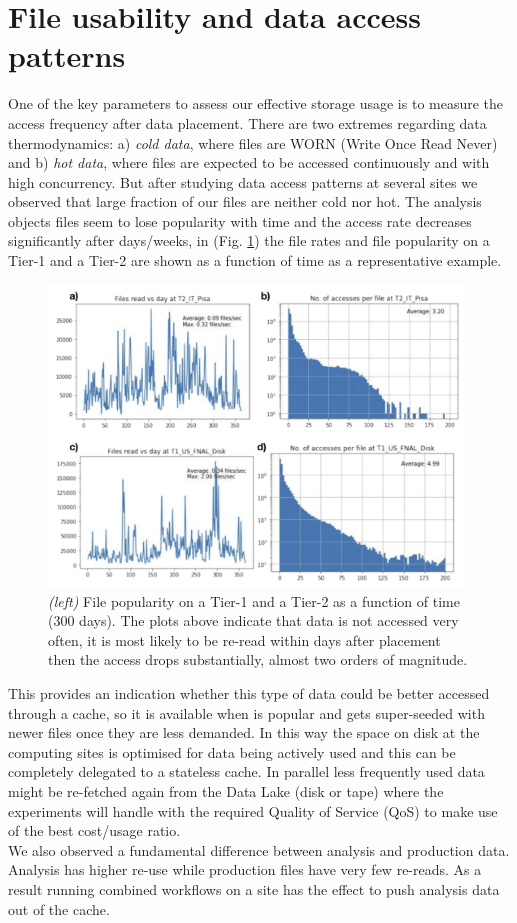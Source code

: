 \section{File usability and data access patterns}
One of the key parameters to assess our effective storage usage is to measure the access frequency after data placement. There are two extremes regarding data thermodynamics: a) \emph{cold data}, where files are WORN (Write Once Read Never) and b) \emph{hot data}, where files are expected to be accessed continuously and with high concurrency. But after studying data access patterns at several sites we observed that large fraction of our files are neither cold nor hot. The analysis objects files seem to lose popularity with time and the access rate decreases significantly after days/weeks, in (Fig. \ref{access}) the file rates and file popularity on a Tier-1 and a Tier-2 are shown as a function of time as a representative example.

\begin{figure}[h]
  \centering
  \includegraphics[height=8cm]{dataaccess-chep2019.png}
  \caption{{\em (left)} File popularity on a Tier-1 and a Tier-2 as a function of time (300 days). The plots above indicate that data is not accessed very often, it is most likely to be re-read within days after placement then the access drops substantially, almost two orders of magnitude.}
  \label{access}
\end{figure}

This provides an indication whether this type of data could be better accessed through a cache, so it is available when is popular and gets super-seeded with newer files once they are less demanded. In this way the space on disk at the computing sites is optimised for data being actively used and this can be completely delegated to a stateless cache. In parallel less frequently used data might be re-fetched again from the Data Lake (disk or tape) where the experiments will handle with the required Quality of Service (QoS) to make use of the best cost/usage ratio.\\
We also observed a fundamental difference between analysis and production data. Analysis has higher re-use while production files have very few re-reads. As a result running combined workflows on a site has the effect to push analysis data out of the cache.

